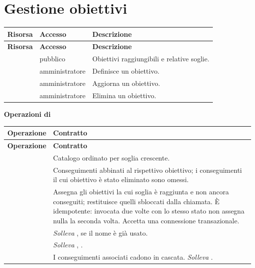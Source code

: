\section{Gestione obiettivi}

\begin{longtable}{@{}L{5.2cm} L{2.6cm} L{6.2cm}@{}}
\toprule
\textbf{Risorsa} & \textbf{Accesso} & \textbf{Descrizione} \\
\midrule
\endfirsthead
\toprule
\textbf{Risorsa} & \textbf{Accesso} & \textbf{Descrizione} \\
\midrule
\endhead
\bottomrule
\endlastfoot

 & pubblico & Obiettivi raggiungibili e relative soglie. \\
 & amministratore & Definisce un obiettivo. \\
 & amministratore & Aggiorna un obiettivo. \\
 & amministratore & Elimina un obiettivo. \\

\end{longtable}

\textbf{Operazioni di }

\begin{longtable}{@{}L{5.4cm} L{9.0cm}@{}}
\toprule
\textbf{Operazione} & \textbf{Contratto} \\
\midrule
\endfirsthead
\toprule
\textbf{Operazione} & \textbf{Contratto} \\
\midrule
\endhead
\bottomrule
\endlastfoot

 & Catalogo ordinato per soglia crescente. \\

 &
Conseguimenti abbinati al rispettivo obiettivo; i conseguimenti il cui
obiettivo è stato eliminato sono omessi. \\

 &
Assegna gli obiettivi la cui soglia è raggiunta e non ancora conseguiti;
restituisce quelli sbloccati dalla chiamata. È idempotente: invocata due
volte con lo stesso stato non assegna nulla la seconda volta. Accetta una
connessione transazionale. \\

 &
\emph{Solleva} ,  se il nome è già usato. \\

 &
\emph{Solleva} , . \\

 &
I conseguimenti associati cadono in cascata.
\emph{Solleva} . \\

\end{longtable}
